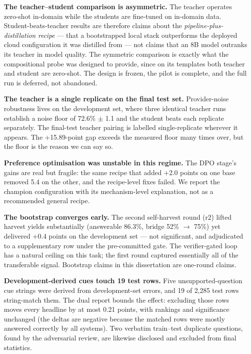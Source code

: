 \documentclass[10pt]{article} %
\begin{document}
\textbf{The teacher--student comparison is asymmetric.} The teacher operates zero-shot in-domain while the students are fine-tuned on in-domain data. Student-beats-teacher results are therefore claims about the \emph{pipeline-plus-distillation recipe} --- that a bootstrapped local stack outperforms the deployed cloud configuration it was distilled from --- not claims that an 8B model outranks its teacher in model quality. The symmetric comparison is exactly what the compositional probe was designed to provide, since on its templates both teacher and student are zero-shot. The design is frozen, the pilot is complete, and the full run is deferred, not abandoned.

\textbf{The teacher is a single replicate on the final test set.} Provider-noise robustness lives on the development set, where three identical teacher runs establish a noise floor of 72.6\% $\pm$ 1.1 and the student beats each replicate separately. The final-test teacher pairing is labelled single-replicate wherever it appears. The +15.89-point gap exceeds the measured floor many times over, but the floor is the reason we can say so.

\textbf{Preference optimisation was unstable in this regime.} The DPO stage's gains are real but fragile: the same recipe that added +2.0 points on one base removed 5.4 on the other, and the recipe-level fixes failed. We report the champion configuration with its mechanism-level explanation, not as a recommended general recipe.

\textbf{The bootstrap converges early.} The second self-harvest round (r2) lifted harvest yields substantially (answerable 86.3\%, bridge 52\% $\rightarrow$ 75\%) yet delivered +0.4 points on the development set --- not significant, and adjudicated to a supplementary row under the pre-committed gate. The verifier-gated loop has a natural ceiling on this task; the first round captured essentially all of the transferable signal. Bootstrap claims in this dissertation are one-round claims.

\textbf{Development-derived cues touch 19 test rows.} Five unsupported-question cue strings were derived from development-set errors, and 19 of 2,285 test rows string-match them. The dual report bounds the effect: excluding those rows moves every headline by at most 0.21 points, with rankings and significance unchanged (the deltas are negative because the matched rows were mostly answered correctly by all systems). Two verbatim train--test duplicate questions, found by the adversarial review, are likewise disclosed and excluded from final statistics.
\end{document}
